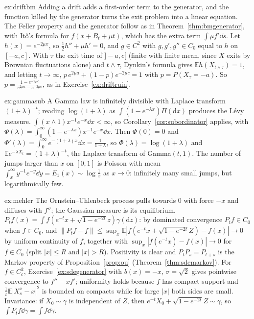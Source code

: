 \begin{solution}{ex:driftbm}
\idea Adding a drift adds a first-order term to the generator, and the function killed by the generator turns the exit problem into a linear equation.
\writeup The Feller property and the generator follow as in Theorem~\ref{thm:bmgenerator}, with It\^o's formula for $f(x+B_t+\mu t)$, which has the extra term $\int\mu f'\dd s$. Let $h(x)=e^{-2\mu x}$, so $\frac12h''+\mu h'=0$, and $g\in C^2$
with $g,g',g''\in C_0$ equal to $h$ on $[-a,c]$. With $\tau$ the exit time of $]-a,c[$ (finite with finite mean, since $X$ exits by Brownian fluctuations alone) and $t\wedge\tau$, Dynkin's formula gives $\mathbb Eh(X_{t\wedge\tau})=1$, and
letting $t\to\infty$, $p\,e^{2\mu a}+(1-p)e^{-2\mu c}=1$ with $p=P(X_\tau=-a)$. So $p=\frac{1-e^{-2\mu c}}{e^{2\mu a}-e^{-2\mu c}}$, as in Exercise~\ref{ex:driftruin}.
\end{solution}

\begin{solution}{ex:gammasub}
\idea A Gamma law is infinitely divisible with Laplace transform $(1+\lambda)^{-t}$; reading $\log(1+\lambda)$ as $\int(1-e^{-\lambda x})\Pi(\mathrm dx)$ produces the L\'evy measure.
\writeup $\int(x\wedge1)x^{-1}e^{-x}\dd x<\infty$, so Corollary~\ref{cor:subordinator} applies, with $\Phi(\lambda)=\int_0^\infty(1-e^{-\lambda x})x^{-1}e^{-x}\dd x$. Then $\Phi(0)=0$ and $\Phi'(\lambda)=\int_0^\infty e^{-(1+\lambda)x}\dd x=\frac1{1+\lambda}$, so
$\Phi(\lambda)=\log(1+\lambda)$ and $\mathbb Ee^{-\lambda X_t}=(1+\lambda)^{-t}$, the Laplace transform of Gamma$(t,1)$. The number of jumps larger than $x$ on $[0,1]$ is Poisson with mean $\int_x^\infty y^{-1}e^{-y}\dd y=E_1(x)\sim\log\frac1x$ as
$x\to0$: infinitely many small jumps, but logarithmically few.
\end{solution}

\begin{solution}{ex:mehler}
\idea The Ornstein--Uhlenbeck process pulls towards $0$ with force $-x$ and diffuses with $f''$; the Gaussian measure is its equilibrium.
\writeup $P_tf(x)=\int f(e^{-t}x+\sqrt{1-e^{-2t}}z)\gamma(\mathrm dz)$: by dominated convergence $P_tf\in C_0$ when $f\in C_0$, and $\|P_tf-f\|\le\sup_x\mathbb E|f(e^{-t}x+\sqrt{1-e^{-2t}}Z)-f(x)|\to0$ by uniform continuity of $f$, together with $\sup_x|f(e^{-t}x)-f(x)|\to0$ for $f\in C_0$ (split $|x|\le R$ and $|x|>R$). Positivity is clear and $P_tP_s=P_{t+s}$ is the Markov property of Proposition~\ref{prop:ou}
(Theorem~\ref{thm:sdemarkov}). For $f\in C^2_c$, Exercise~\ref{ex:sdegenerator} with $b(x)=-x$, $\sigma=\sqrt2$ gives pointwise convergence to $f''-xf'$; uniformity holds because $f$ has compact support and
$\frac1t\mathbb E|X^x_s-x|^2$ is bounded on compacts while for large $|x|$ both sides are small. Invariance: if $X_0\sim\gamma$ is independent of $Z$, then $e^{-t}X_0+\sqrt{1-e^{-2t}}Z\sim\gamma$, so $\int P_tf\dd\gamma=\int f\dd\gamma$.
\end{solution}

